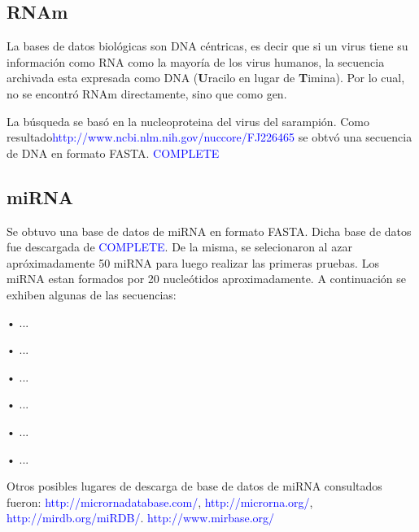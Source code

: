 \documentclass[12pt,a4paper,spanish]{article}
\begin{document}
	\subsection{RNAm}
		\par La bases de datos biológicas son DNA céntricas, es decir que si un virus tiene su información como RNA como la mayoría de los virus humanos, 			la secuencia archivada esta expresada como DNA (\textbf{U}racilo en lugar de \textbf{T}imina). Por lo cual, no se encontró RNAm directamente, sino 			que como gen.
		\par La búsqueda se basó en la nucleoproteina del virus del sarampión. Como 
		resultado\textcolor{blue}{http://www.ncbi.nlm.nih.gov/nuccore/FJ226465} se obtvó una secuencia de DNA en formato FASTA.
		\textcolor{blue}{COMPLETE}


	\subsection{miRNA}
		\par Se obtuvo una base de datos de miRNA en formato FASTA. Dicha base de datos fue descargada de \textcolor{blue}{COMPLETE}. De la misma, se 			selecionaron al azar apróximadamente 50 miRNA para luego realizar las primeras pruebas. Los miRNA estan formados por 20 nucleótidos 		
		aproximadamente. A continuación se exhiben algunas de las secuencias: 
			\par \hspace*{0.75cm} • \textsc{...}
			\par \hspace*{0.75cm} • \textsc{...}
			\par \hspace*{0.75cm} • \textsc{...}
			\par \hspace*{0.75cm} • \textsc{...}
			\par \hspace*{0.75cm} • \textsc{...}
			\par \hspace*{0.75cm} • \textsc{...}
		\par Otros posibles lugares de descarga de base de datos de miRNA consultados fueron: \textcolor{blue}{http://micrornadatabase.com/},
		\textcolor{blue}{http://microrna.org/}, \textcolor{blue}{http://mirdb.org/miRDB/}. \textcolor{blue}{http://www.mirbase.org/}
\end{document}
